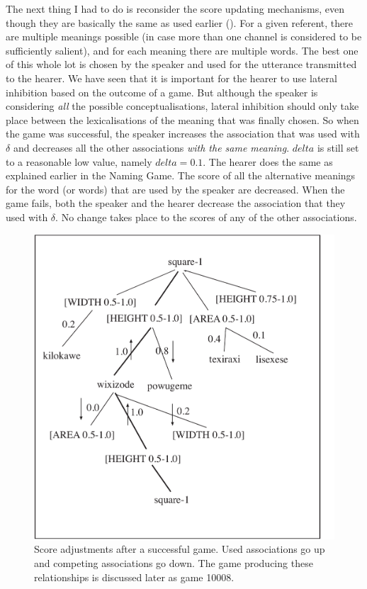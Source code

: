 The next thing I had to do is reconsider the score
updating mechanisms, even though they are basically 
the same as used earlier (). 
For a given referent, there are multiple meanings possible
(in case more than one channel is considered to 
be sufficiently salient), and
for each meaning there are multiple words. The best 
one of this whole lot is chosen by the speaker and used
for the utterance transmitted to the hearer. We have 
seen that it is important for the hearer to use lateral
inhibition based on the outcome of a game. But although 
the speaker is considering {\it all} the possible 
conceptualisations, lateral
inhibition should only take place between the 
lexicalisations of the meaning that was finally chosen. 
So when the game was successful, 
the speaker increases the association that was used with $\delta$
and decreases all the other associations
{\it with the same meaning}. $delta$ is still set to a reasonable
low value, namely $delta = 0.1$. 
The hearer does the same as explained earlier in 
the Naming Game. The score of all
the alternative meanings for the word (or words) 
that are used by the speaker are decreased. 
When the game fails, both the speaker and the hearer 
decrease the association that they used with $\delta$. No
change takes place to the scores of any of the 
other associations. 
\begin{figure}[htbp]
  \centerline{\includegraphics[width=.50\textwidth]{chap6/figs/incr-decr2}}
\caption{\label{incr-decr2}
Score adjustments after a successful game. Used 
associations go up and competing associations go down.
The game producing these relationships is discussed
later as game 10008.}
\end{figure}

